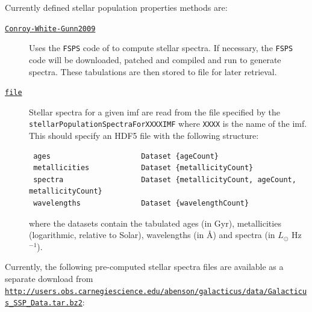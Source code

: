 Currently defined stellar population properties methods are:
\begin{description}
 \item [\hyperlink{stellar_populations.spectra.Conroy_et_al.F90:stellar_population_spectra_conroy}{{\tt Conroy-White-Gunn2009}}] Uses the {\tt FSPS} code of \cite{conroy_propagation_2009} to compute stellar spectra. If necessary, the {\tt FSPS} code will be downloaded, patched and compiled and run to generate spectra. These tabulations are then stored to file for later retrieval.
 \item [\hyperlink{stellar_populations.spectra.file.F90:stellar_population_spectra_file}{{\tt file}}] Stellar spectra for a given \gls{imf} are read from the file specified by the {\tt stellarPopulationSpectraForXXXXIMF} where {\tt XXXX} is the name of the \gls{imf}. This should specify an HDF5 file with the following structure:
\begin{verbatim}
 ages                     Dataset {ageCount}
 metallicities            Dataset {metallicityCount}
 spectra                  Dataset {metallicityCount, ageCount, metallicityCount}
 wavelengths              Dataset {wavelengthCount}
\end{verbatim}
where the datasets contain the tabulated ages (in Gyr), metallicities (logarithmic, relative to Solar), wavelengths (in \AA) and spectra (in $L_\odot$ Hz$^{-1}$).
\end{description}
Currently, the following pre-computed stellar spectra files are available as a separate download from \href{http://users.obs.carnegiescience.edu/abenson/galacticus/data/Galacticus_SSP_Data.tar.bz2}{\tt http://users.obs.carnegiescience.edu/abenson/galacticus/data/Galacticus\_SSP\_Data.tar.bz2}:
